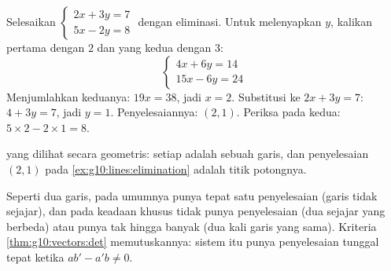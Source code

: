 \begin{example}\label{ex:g10:lines:elimination}
Selesaikan $\begin{cases} 2x + 3y = 7 \\ 5x - 2y = 8 \end{cases}$ dengan
eliminasi. Untuk melenyapkan $y$, kalikan  pertama dengan $2$ dan
yang kedua dengan $3$:
\[
\begin{cases}
4x + 6y = 14 \\
15x - 6y = 24
\end{cases}
\]
Menjumlahkan keduanya: $19x = 38$, jadi $x = 2$. Substitusi ke $2x + 3y = 7$:
$4 + 3y = 7$, jadi $y = 1$. Penyelesaiannya: $(2, 1)$. Periksa pada 
kedua: $5 \times 2 - 2 \times 1 = 8$.
\end{example}

\begin{omfigure}

{\small {} yang dilihat secara geometris: setiap
 adalah sebuah garis, dan penyelesaian $(2,1)$ pada
\cref{ex:g10:lines:elimination} adalah titik potongnya.}
\end{omfigure}

\begin{remark}
Seperti dua garis,  pada umumnya punya tepat satu
penyelesaian (garis tidak sejajar), dan pada keadaan khusus tidak punya
penyelesaian (dua sejajar yang berbeda) atau punya tak hingga banyak (dua kali
garis yang sama). Kriteria \cref{thm:g10:vectors:det} memutuskannya: sistem itu
punya penyelesaian tunggal tepat ketika $ab' - a'b \neq 0$.
\end{remark}

